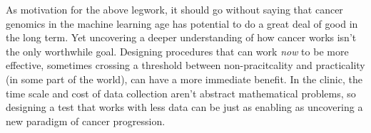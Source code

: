 \documentclass[thesis.tex]{subfiles}
\begin{document}
As motivation for the above legwork, it should go without saying that cancer genomics in the machine learning age has potential to do a great deal of good in the long term. Yet uncovering a deeper understanding of how cancer works isn't the only worthwhile goal. Designing procedures that can work \textit{now} to be more effective, sometimes crossing a threshold between non-pracitcality and practicality (in some part of the world), can have a more immediate benefit. In the clinic, the time scale and cost of data collection aren't abstract mathematical problems, so designing a test that works with less data can be just as enabling as uncovering a new paradigm of cancer progression. 

\dobib %
\end{document}

